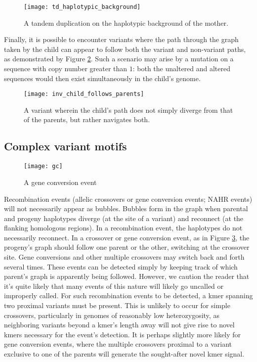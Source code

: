 \begin{figure}[h!]
  \centering
    \texttt{[image: td\_haplotypic\_background]}
  \caption{A tandem duplication on the haplotypic background of the mother.}
  \label{fig:td_haplotypic_background}
\end{figure}

Finally, it is possible to encounter variants where the path through the graph taken by the child can appear to follow both the variant and non-variant paths, as demonstrated by Figure \ref{fig:inv_child_follows_parents}.  Such a scenario may arise by a mutation on a sequence with copy number greater than $1$: both the unaltered and altered sequences would then exist simultaneously in the child's genome.

\begin{figure}[h!]
  \centering
    \texttt{[image: inv\_child\_follows\_parents]}
  \caption{A variant wherein the child's path does not simply diverge from that of the parents, but rather navigates both.}
  \label{fig:inv_child_follows_parents}
\end{figure}

\subsection{Complex variant motifs}

\begin{figure}[h!]
  \centering
    \texttt{[image: gc]}
  \caption{A gene conversion event}
  \label{fig:gc}
\end{figure}

Recombination events (allelic crossovers or gene conversion events; NAHR events) will not necessarily appear as bubbles.  Bubbles form in the graph when parental and progeny haplotypes diverge (at the site of a variant) and reconnect (at the flanking homologous regions).  In a recombination event, the haplotypes do not necessarily reconnect.  In a crossover or gene conversion event, as in Figure \ref{fig:gc}, the progeny's graph should follow one parent or the other, switching at the crossover site.  Gene conversions and other multiple crossovers may switch back and forth several times.  These events can be detected simply by keeping track of which parent's graph is apparently being followed.  However, we caution the reader that it's quite likely that many events of this nature will likely go uncalled or improperly called.  For such recombination events to be detected, a kmer spanning two proximal variants must be present.  This is unlikely to occur for simple crossovers, particularly in genomes of reasonably low heterozygosity, as neighboring variants beyond a kmer's length away will not give rise to novel kmers necessary for the event's detection.  It is perhaps slightly more likely for gene conversion events, where the multiple crossovers proximal to a variant exclusive to one of the parents will generate the sought-after novel kmer signal.

